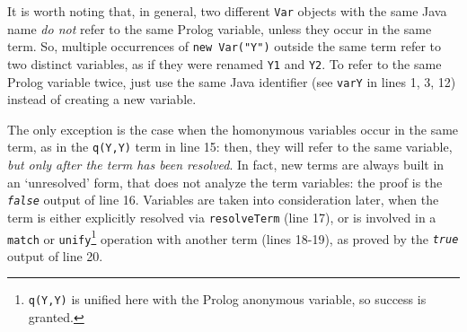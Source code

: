 It is worth noting that, in general, two different \texttt{Var} objects with the same Java name \textit{do not} refer to the same Prolog variable, unless they occur in the same term.
So, multiple occurrences of \texttt{new Var("Y")} outside the same term refer to two distinct variables, as if they were renamed \texttt{Y1} and \texttt{Y2}.
%
To refer to the same Prolog variable twice, just use the same Java identifier (see \texttt{varY} in lines 1, 3, 12) instead of creating a new variable.

The only exception is the case when the homonymous variables occur in the same term, as in the \texttt{q(Y,Y)} term in line 15: then, they will refer to the same variable, \textit{but only after the term has been resolved}.
In fact, new terms are always built in an `unresolved' form, that does not analyze the term variables: the proof is the \textit{\texttt{false}} output of line 16.
Variables are taken into consideration later, when the term is either explicitly resolved via \texttt{resolveTerm} (line 17), or is involved in a \texttt{match} or \texttt{unify}\footnote{\texttt{q(Y,Y)} is unified here with the Prolog anonymous variable, so success is granted.} operation with another term (lines 18-19), as proved by the \textit{\texttt{true}} output of line 20.

